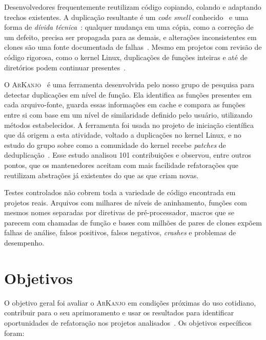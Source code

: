 \documentclass{article}
\newcommand{\scene}[2]{\todo[size=\tiny,color=blue!10]{#1 (#2)}}
\newcommand{\ark}{\textsc{ArKanjo}}
\begin{document}
\scene{Scene 1}{0:20--1:30}

Desenvolvedores frequentemente reutilizam código copiando, colando e adaptando trechos existentes. A duplicação resultante é um \emph{code smell} conhecido~\cite{fowler2018refactoring} e uma forma de \emph{dívida técnica}~\cite{kruchten2012debt,seaman2011measuring}: qualquer mudança em uma cópia, como a correção de um defeito, precisa ser propagada para as demais, e alterações inconsistentes em clones são uma fonte documentada de falhas~\cite{juergens2009clones}. Mesmo em projetos com revisão de código rigorosa, como o kernel Linux, duplicações de funções inteiras e até de diretórios podem continuar presentes~\cite{kumar2016bigclones}.

O \ark{}~\cite{arcanjo2025debconf,arcanjo2025dissertacao} é uma ferramenta desenvolvida pelo nosso grupo de pesquisa para detectar duplicações em nível de função. Ela identifica as funções presentes em cada arquivo-fonte, guarda essas informações em cache e compara as funções entre si com base em um nível de similaridade definido pelo usuário, utilizando métodos estabelecidos. A ferramenta foi usada no projeto de iniciação científica que dá origem a esta atividade, voltado a duplicações no kernel Linux, e no estudo do grupo sobre como a comunidade do kernel recebe \emph{patches} de deduplicação~\cite{duplicationdebt2026}. Esse estudo analisou 101 contribuições e observou, entre outros pontos, que os mantenedores aceitam com mais facilidade refatorações que reutilizam abstrações já existentes do que as que criam novas.

Testes controlados não cobrem toda a variedade de código encontrada em projetos reais. Arquivos com milhares de níveis de aninhamento, funções com mesmos nomes separadas por diretivas de pré-processador, macros que se parecem com chamadas de função e bases com milhões de pares de clones expõem falhas de análise, falsos positivos, falsos negativos, \textit{crashes} e problemas de desempenho.

\section{Objetivos}

\scene{Scene 2}{1:30--2:15}

O objetivo geral foi avaliar o \ark{} em condições próximas do uso cotidiano, contribuir para o seu aprimoramento e usar os resultados para identificar oportunidades de refatoração nos projetos analisados~\cite{arkanjodiscussions}. Os objetivos específicos foram:
\end{document}
